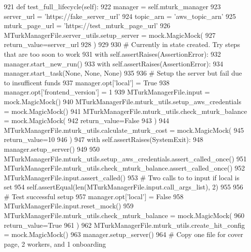 \begin{DoxyCode}
921     \textcolor{keyword}{def }test\_full\_lifecycle(self):
922         manager = self.mturk\_manager
923         server\_url = \textcolor{stringliteral}{'https://fake\_server\_url'}
924         topic\_arn = \textcolor{stringliteral}{'aws\_topic\_arn'}
925         mturk\_page\_url = \textcolor{stringliteral}{'https://test\_mturk\_page\_url'}
926         MTurkManagerFile.server\_utils.setup\_server = mock.MagicMock(
927             return\_value=server\_url
928         )
929 
930         \textcolor{comment}{# Currently in state created. Try steps that are too soon to work}
931         with self.assertRaises(AssertionError):
932             manager.start\_new\_run()
933         with self.assertRaises(AssertionError):
934             manager.start\_task(\textcolor{keywordtype}{None}, \textcolor{keywordtype}{None}, \textcolor{keywordtype}{None})
935 
936         \textcolor{comment}{# Setup the server but fail due to insufficent funds}
937         manager.opt[\textcolor{stringliteral}{'local'}] = \textcolor{keyword}{True}
938         manager.opt[\textcolor{stringliteral}{'frontend\_version'}] = 1
939         MTurkManagerFile.input = mock.MagicMock()
940         MTurkManagerFile.mturk\_utils.setup\_aws\_credentials = mock.MagicMock()
941         MTurkManagerFile.mturk\_utils.check\_mturk\_balance = mock.MagicMock(
942             return\_value=\textcolor{keyword}{False}
943         )
944         MTurkManagerFile.mturk\_utils.calculate\_mturk\_cost = mock.MagicMock(
945             return\_value=10
946         )
947         with self.assertRaises(SystemExit):
948             manager.setup\_server()
949 
950         MTurkManagerFile.mturk\_utils.setup\_aws\_credentials.assert\_called\_once()
951         MTurkManagerFile.mturk\_utils.check\_mturk\_balance.assert\_called\_once()
952         MTurkManagerFile.input.assert\_called()
953         \textcolor{comment}{# Two calls to to input if local is set}
954         self.assertEqual(len(MTurkManagerFile.input.call\_args\_list), 2)
955 
956         \textcolor{comment}{# Test successful setup}
957         manager.opt[\textcolor{stringliteral}{'local'}] = \textcolor{keyword}{False}
958         MTurkManagerFile.input.reset\_mock()
959         MTurkManagerFile.mturk\_utils.check\_mturk\_balance = mock.MagicMock(
960             return\_value=\textcolor{keyword}{True}
961         )
962         MTurkManagerFile.mturk\_utils.create\_hit\_config = mock.MagicMock()
963         manager.setup\_server()
964         \textcolor{comment}{# Copy one file for cover page, 2 workers, and 1 onboarding}

\end{DoxyCode}
